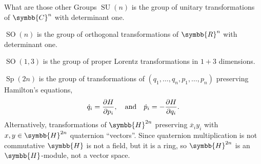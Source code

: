 \documentclass{beamer}
\newcommand{\complex}{\symbb{C}}
\newcommand{\reals}{\symbb{R}}
\newcommand{\quaternions}{\symbb{H}}
\DeclareMathOperator{\specialUnitary}{SU}
\DeclareMathOperator{\specialOrthogonal}{SO}
\DeclareMathOperator{\symplectic}{Sp}
\begin{document}
    \begin{frame}{What are those other Groups}
        \(\specialUnitary(n)\) is the group of unitary transformations of \(\complex^n\) with determinant one.
        
        \(\specialOrthogonal(n)\) is the group of orthogonal transformations of \(\reals^n\) with determinant one.
        
        \(\specialOrthogonal(1, 3)\) is the group of proper Lorentz transformations in \(1 + 3\) dimensions.
        
        \(\symplectic(2n)\) is the group of transformations of \((q_1, \dotsc, q_n, p_1, \dotsc, p_n)\) preserving Hamilton's equations,
        \begin{equation*}
            \dot{q}_i = \diffp{H}{p_i}, \quad\text{and}\quad \dot{p}_i = -\diffp{H}{q_i}.
        \end{equation*}
        Alternatively, transformations of \(\quaternions^{2n}\) preserving \(\overline{x}_iy_i\) with \(x, y \in \quaternions^{2n}\) quaternion \enquote{vectors}. {\tiny Since quaternion multiplication is not commutative \(\quaternions\) is not a field, but it is a ring, so \(\quaternions^{2n}\) is an \(\quaternions\)-module, not a vector space.}
    \end{frame}
\end{document}
